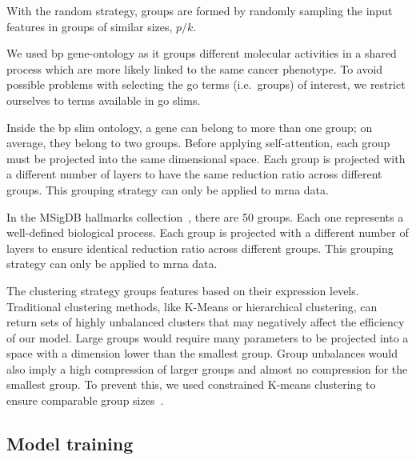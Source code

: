 \documentclass[../main.tex]{subfiles}
\begin{document}
	 \begin{description}[
			 style=multiline,
			 leftmargin=!,
			 labelwidth=\eqboxwidth{listlabel@\EnumitemId}, format=\mylabelformat
		 ]
		 \item[Random] With the random strategy, groups are formed by randomly sampling the input features in groups of similar sizes, $p/k$.
		 \item[Gene Ontology] We used \gls{bp} gene-ontology as it groups different molecular activities in a shared process which are more likely linked to the same cancer phenotype.
		       To avoid possible problems with selecting the \gls{go} terms (i.e.\ groups) of interest, we restrict ourselves to terms available in \gls{go} slims.

		       Inside the \gls{bp} slim ontology, a gene can belong to more than one group; on average, they belong to two groups.
		       Before applying self-attention, each group must be projected into the same dimensional space.
		       Each group is projected with a different number of layers to have the same reduction ratio across different groups. This grouping strategy can only be applied to \gls{mrna} data.
		 \item[Hallmarks] In the MSigDB hallmarks collection~\cite{Liberzon2015}, there are 50 groups.
		       Each one represents a well-defined biological process.
		       Each group is projected with a different number of layers to ensure identical reduction ratio across different groups. This grouping strategy can only be applied to \gls{mrna} data.
		 \item[Clustering]The clustering strategy groups features based on their expression levels.
		       Traditional clustering methods, like K-Means or hierarchical clustering, can return sets of highly unbalanced clusters that may negatively affect the efficiency of our model.
		       Large groups would require many parameters to be projected into a space with a dimension lower than the smallest group.
		       Group unbalances would also imply a high compression of larger groups and almost no compression for the smallest group.
		       To prevent this, we used constrained K-means clustering to ensure comparable group sizes~\cite{bradleyConstrainedKMeansClustering}.
	 \end{description}


 \subsection{Model training}
\end{document}
